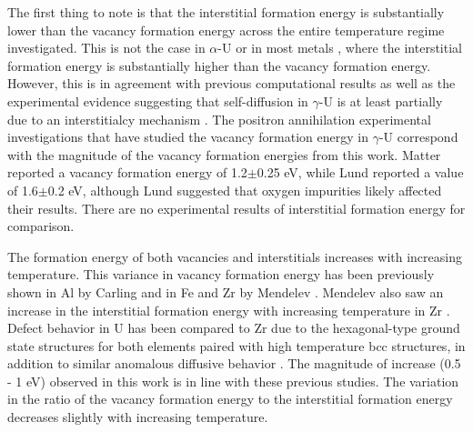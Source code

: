 \documentclass[review]{elsarticle}
\begin{document}
The first thing to note is that the interstitial formation energy is substantially lower than the vacancy formation energy across the entire temperature regime investigated. This is not the case in $\alpha$-U \cite{wirth2011} or in most metals \cite{schultz1968, baskes1979, lee2001, lee2003}, where the interstitial formation energy is substantially higher than the vacancy formation energy. However, this is in agreement with previous computational results \cite{beeler2010} as well as the experimental evidence suggesting that self-diffusion in $\gamma$-U is at least partially due to an interstitialcy mechanism \cite{fedorov1978, smirnov1992, mehrer2011}. The positron annihilation experimental investigations that have studied the vacancy formation energy in $\gamma$-U correspond with the magnitude of the vacancy formation energies from this work. Matter \cite{matter1980} reported a vacancy formation energy of 1.2$\pm$0.25 eV, while Lund \cite{lund2013} reported a value of 1.6$\pm$0.2 eV, although Lund suggested that oxygen impurities likely affected their results. There are no experimental results of interstitial formation energy for comparison.

The formation energy of both vacancies and interstitials increases with increasing temperature. This variance in vacancy formation energy has been previously shown in Al by Carling \cite{carling2003} and in Fe and Zr by Mendelev \cite{mendelev2009, mendelev2010}. Mendelev also saw an increase in the interstitial formation energy with increasing temperature in Zr \cite{mendelev2010}. Defect behavior in U has been compared to Zr due to the hexagonal-type ground state structures for both elements paired with high temperature bcc structures, in addition to similar anomalous diffusive behavior \cite{matter1980,kidson1961}. The magnitude of increase (0.5 - 1 eV) observed in this work is in line with these previous studies. The variation in the ratio of the vacancy formation energy to the interstitial formation energy decreases slightly with increasing temperature.
\end{document}
